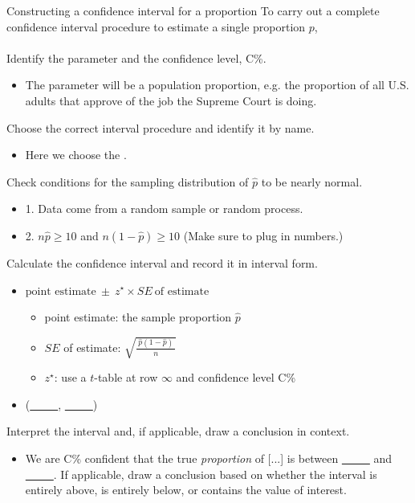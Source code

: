\begin{onebox}{Constructing a confidence interval for a proportion}
To carry out a complete confidence interval procedure to estimate a single proportion $p$,
\\
\\
 Identify the parameter and the confidence level, C\%. \vspace{-1mm}
\begin{itemize} 
\item[] The parameter will be a population proportion, e.g. the proportion of all U.S. adults that approve of the job the Supreme Court is doing.
\end{itemize}
 Choose the correct interval procedure and identify it by name. \vspace{-1mm}
\begin{itemize} 
\item[] Here we choose the .
\end{itemize}
 Check conditions for the sampling distribution of $\hat{p}$ to be nearly normal.\vspace{-1mm}
\begin{itemize}
\setlength{\itemsep}{0mm}
\item[] 1. Data come from a random sample or random process.
\item[] 2. $n\hat{p}\ge 10$ and $n(1-\hat{p})\ge 10$  \quad  (Make sure to plug in numbers.) 

\end{itemize}
 Calculate the confidence interval and record it in interval form.
\begin{itemize}
\item[] $\text{point estimate}\ \pm\ z^{\star} \times SE\ \text{of estimate}$
\begin{itemize}
\item[] point estimate: the sample proportion $\hat{p}$
\item[] $SE$ of estimate:  $\sqrt{\frac{\ \hat{p}(1-\hat{p})\ }{n}}$
\item[] $z^{\star}$: use a $t$-table at row $\infty$ and confidence level C\%
\end{itemize}
\item[] (\underline{\ \ \ \ \ }, \underline{\ \ \ \ \ })
\end{itemize}
 Interpret the interval and, if applicable, draw a conclusion in context.\vspace{-1mm}
\begin{itemize}
\item[] We are C\%  confident that the true \emph{proportion} of [...] is between \underline{\ \ \ \ \ } and  \underline{\ \ \ \ \ }. If applicable, draw a conclusion based on whether the interval is entirely above, is entirely below, or contains the value of interest. 
\end{itemize}\end{onebox}


